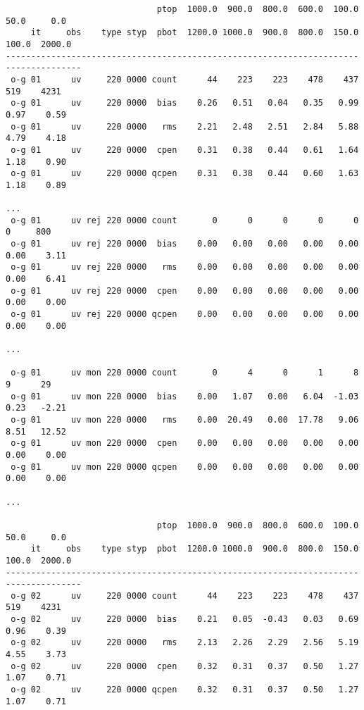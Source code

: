 \begin{scriptsize}
\begin{verbatim}
                              ptop  1000.0  900.0  800.0  600.0  100.0   50.0     0.0
     it     obs    type styp  pbot  1200.0 1000.0  900.0  800.0  150.0  100.0  2000.0
-------------------------------------------------------------------------------------
 o-g 01      uv     220 0000 count      44    223    223    478    437    519    4231
 o-g 01      uv     220 0000  bias    0.26   0.51   0.04   0.35   0.99   0.97    0.59
 o-g 01      uv     220 0000   rms    2.21   2.48   2.51   2.84   5.88   4.79    4.18
 o-g 01      uv     220 0000  cpen    0.31   0.38   0.44   0.61   1.64   1.18    0.90
 o-g 01      uv     220 0000 qcpen    0.31   0.38   0.44   0.60   1.63   1.18    0.89

...
 o-g 01      uv rej 220 0000 count       0      0      0      0      0      0     800
 o-g 01      uv rej 220 0000  bias    0.00   0.00   0.00   0.00   0.00   0.00    3.11
 o-g 01      uv rej 220 0000   rms    0.00   0.00   0.00   0.00   0.00   0.00    6.41
 o-g 01      uv rej 220 0000  cpen    0.00   0.00   0.00   0.00   0.00   0.00    0.00
 o-g 01      uv rej 220 0000 qcpen    0.00   0.00   0.00   0.00   0.00   0.00    0.00

...

 o-g 01      uv mon 220 0000 count       0      4      0      1      8      9      29
 o-g 01      uv mon 220 0000  bias    0.00   1.07   0.00   6.04  -1.03   0.23   -2.21
 o-g 01      uv mon 220 0000   rms    0.00  20.49   0.00  17.78   9.06   8.51   12.52
 o-g 01      uv mon 220 0000  cpen    0.00   0.00   0.00   0.00   0.00   0.00    0.00
 o-g 01      uv mon 220 0000 qcpen    0.00   0.00   0.00   0.00   0.00   0.00    0.00

...

                              ptop  1000.0  900.0  800.0  600.0  100.0   50.0     0.0
     it     obs    type styp  pbot  1200.0 1000.0  900.0  800.0  150.0  100.0  2000.0
-------------------------------------------------------------------------------------
 o-g 02      uv     220 0000 count      44    223    223    478    437    519    4231
 o-g 02      uv     220 0000  bias    0.21   0.05  -0.43   0.03   0.69   0.96    0.39
 o-g 02      uv     220 0000   rms    2.13   2.26   2.29   2.56   5.19   4.55    3.73
 o-g 02      uv     220 0000  cpen    0.32   0.31   0.37   0.50   1.27   1.07    0.71
 o-g 02      uv     220 0000 qcpen    0.32   0.31   0.37   0.50   1.27   1.07    0.71


\end{verbatim}
\end{scriptsize}
